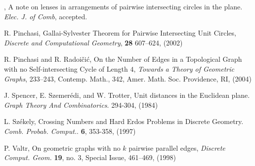 \documentclass[11pt,a4paper]{article}
\begin{document}
\begin{thebibliography}{10}
,
{A note on lenses in arrangements of pairwise intersecting circles in the plane}.
{\it Elec. J. of Comb}, accepted.

{R. Pinchasi},
{Gallai-Sylvester Theorem for Pairwise Intersecting Unit 
Circles},
{\it Discrete and Computational Geometry},
{\bf 28} 607--624, (2002)

{R. Pinchasi and R. Radoi\v ci\'c},
{On the Number of Edges in a Topological Graph with no 
Self-intersecting Cycle of Length $4$},
{\it Towards a Theory of Geometric Graphs}, 233--243, Contemp. Math., 342,
Amer. Math. Soc. Providence, RI, (2004)

 {J. Spencer, E. Szemerédi, and W. Trotter},
Unit distances in the Euclidean plane. {\em Graph Theory And Combinatorics}. 294-304, (1984)

 {L. Székely},
Crossing Numbers and Hard Erdos Problems in Discrete Geometry. {\em Comb. Probab. Comput.}. \textbf{6}, 353-358, (1997) 

 {P. Valtr}, On geometric graphs with no $k$ pairwise parallel edges, {\em Discrete Comput. Geom.}
{\bf 19}, no. 3, Special Issue, 461--469, (1998)





\end{thebibliography}
\end{document}
